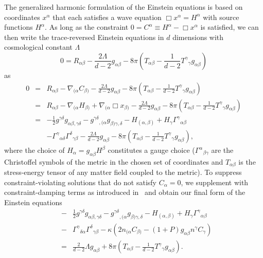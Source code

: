 \documentclass[a4paper,11pt]{article}
\numberwithin{equation}{section}
\begin{document}
The generalized harmonic formulation of the Einstein equations is based on coordinates $x^\alpha$ that each satisfies a wave equation $\Box x^{\alpha}=H^\alpha$ with source functions $H^\alpha$.
As long as the constraint $0=C^\alpha \equiv H^\alpha-\Box x^\alpha$ is satisfied, we can then write the trace-reversed Einstein equations in $d$ dimensions with cosmological constant $\Lambda$
\begin{equation}
0=R_{\alpha\beta} - \frac{2\Lambda}{d-2} g_{\alpha\beta} - 8\pi\left( T_{\alpha\beta} - \frac{1}{d-2} {T^\gamma}_\gamma g_{\alpha\beta} \right)
\end{equation}
as
\begin{eqnarray}
0
&=& R_{\alpha\beta} - \nabla_{(\alpha} C_{\beta)} - \frac{2\Lambda}{d-2} g_{\alpha\beta} - 8\pi\left( T_{\alpha\beta} - \frac{1}{d-2} {T^\gamma}_\gamma g_{\alpha\beta} \right) \nonumber \\
&=& R_{\alpha\beta} - \nabla_{(\alpha} H_{\beta)} + \nabla_{(\alpha} \Box{x}_{\beta)} - \frac{2\Lambda}{d-2} g_{\alpha\beta} - 8\pi\left( T_{\alpha\beta} - \frac{1}{d-2} {T^\gamma}_\gamma g_{\alpha\beta} \right) \nonumber \\
&=& -\frac{1}{2} g^{\gamma\delta} g_{\alpha\beta,\gamma\delta} - g^{\gamma\delta}{}_{,(\alpha}g_{\beta)\gamma,\delta} - H_{(\alpha,\beta)} + H_\gamma \Gamma^\gamma{}_{\alpha\beta} \nonumber \\
&&- \Gamma^\gamma{}_{\alpha\delta}\Gamma^\delta{}_{\gamma\beta} - \frac{2\Lambda}{d-2} g_{\alpha\beta} - 8\pi\left( T_{\alpha\beta} - \frac{1}{d-2} {T^\gamma}_\gamma g_{\alpha\beta} \right) \nonumber,
\end{eqnarray}
where the choice of $H_\alpha = g_{\alpha\beta} H^\beta$ constitutes a gauge choice ($\Gamma^\alpha{}_{\beta\gamma}$ are the Christoffel symbols of the metric in the chosen set of coordinates and $T_{\alpha\beta}$ is the stress-energy tensor of any matter field coupled to the metric). 
To suppress constraint-violating solutions that do not satisfy $C_\alpha=0$, we supplement with constraint-damping terms as introduced in~\cite{Gundlach:2005eh} and obtain our final form of the Einstein equations
\begin{eqnarray}\label{eqn:efe_gh_modified}
&-& \frac{1}{2} g^{\gamma \delta} g_{\alpha\beta, \gamma \delta} - 
{g^{\gamma\delta}}_{,(\alpha} g_{\beta) \gamma, \delta} - H_{(\alpha, \beta)} + H_\gamma {\Gamma^\gamma}_{\alpha\beta} \nonumber \\
&-& {\Gamma^\gamma}_{\delta \alpha} {\Gamma^\delta}_{\gamma \beta} - \kappa \left( 2 n_{(\alpha} C_{\beta)} - (1+P) g_{\alpha\beta} n^\gamma 
C_\gamma \right) \nonumber \\
&=&   \frac{2}{d-2} \Lambda g_{\alpha\beta} + 8\pi \left( T_{\alpha\beta} - 
\frac{1}{d-2} {T^\gamma}_\gamma g_{\alpha\beta} \right).
\end{eqnarray}
\end{document}
